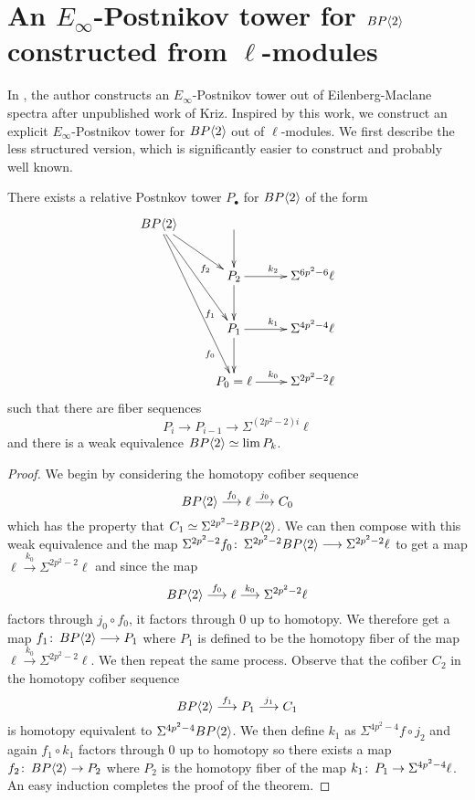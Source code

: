 
\section{An $E_{\infty}$-Postnikov tower for $BP\langle 2 \rangle$ constructed from $\ell$-modules}
In \cite{Basterra}, the author constructs an $E_{\infty}$-Postnikov tower out of Eilenberg-Maclane spectra after unpublished work of Kriz. Inspired by this work, we construct an explicit $E_{\infty}$-Postnikov tower for $BP\langle 2 \rangle$ out of $\ell$-modules. We first describe the less structured version, which is significantly easier to construct and probably well known. 
\begin{thm}
There exists a relative Postnkov tower $P_{\bullet}$ for $BP\langle 2 \rangle$ of the form 
\[ 
\xymatrix{
\B \ar[dr]_(.7){f_2} \ar[ddr]_(.8){f_1} \ar[dddr]_(.8){f_0} &	\ar[d] & \\
	&P_2 \ar[d] \ar[r]^{k_2} & \Sigma^{6p^2-6}\ell \\
	&P_1 \ar[d] \ar[r]^{k_1} & \Sigma^{4p^2-4}\ell \\
	&P_0=\ell \ar[r]^{k_0} &  \Sigma^{2p^2-2}\ell 
}
\]
such that there are fiber sequences 
\[ P_i\to P_{i-1}\to \Sigma^{(2p^2-2)i}\ell  \]
and there is a weak equivalence
$BP\langle 2 \rangle\simeq \lim P_k$.
\end{thm}
\begin{proof}
We begin by considering the homotopy cofiber sequence 
\[ BP\langle 2 \rangle \overset{f_0}{\longrightarrow} \ell \overset{j_0}{\longrightarrow} C_0 \]
which has the property that $C_1\simeq \Sigma^{2p^2-2}BP\langle 2 \rangle$. We can then compose with this weak equivalence and the map $\Sigma^{2p^2-2}f_0 \colon \thinspace \Sigma^{2p^2-2}BP\langle 2 \rangle\longrightarrow \Sigma^{2p^2-2}\ell$ to get a map 
$\ell \overset{k_0}{\longrightarrow} \Sigma^{2p^2-2}\ell$
and since the map 
\[ BP\langle 2 \rangle \overset{f_0}{\longrightarrow} \ell \overset{k_0}{\longrightarrow}\Sigma^{2p^2-2}\ell \]
factors through $j_0\circ f_0$, it factors through $0$ up to homotopy. We therefore get a map $f_1\colon \thinspace BP\langle 2 \rangle\longrightarrow P_1$ where $P_1$ is defined to be the homotopy fiber of the map $\ell\overset{k_0}{\longrightarrow} \Sigma^{2p^2-2}\ell$. We then repeat the same process. Observe that the cofiber $C_2$ in the homotopy cofiber sequence 
\[ BP\langle 2 \rangle \overset{f_1}{\longrightarrow} P_1 \overset{j_1}{\longrightarrow} C_1 \]
is homotopy equivalent to $\Sigma^{4p^2-4}BP\langle 2 \rangle$. We then define $k_1$ as $\Sigma^{4p^2-4}f\circ j_2$ and again $f_1\circ k_1$ factors through $0$ up to homotopy so there exists a map $f_2\colon \thinspace BP\langle 2 \rangle \to P_2$ where $P_2$ is the homotopy fiber of the map $k_1\colon \thinspace P_1 \to \Sigma^{4p^2-4}\ell$. An easy induction completes the proof of the theorem. 
\end{proof}
